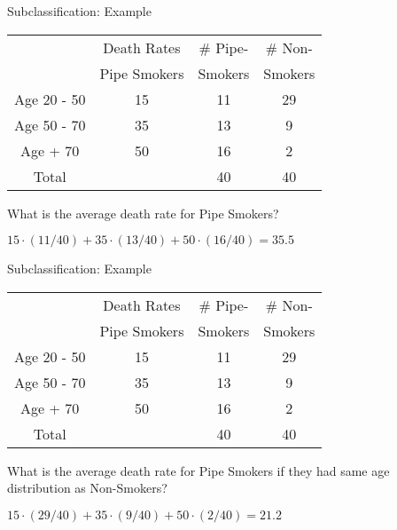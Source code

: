 \documentclass{beamer}
\numberwithin{equation}{section}
\begin{document}
\begin{frame}{Subclassification: Example}

\begin{center}
\begin{tabular}{|c|c|c|c|}
\hline
\multicolumn{ 1}{|c|}{} & \multicolumn{ 1}{c|}{Death Rates  } & \# Pipe- & \# Non- \\

\multicolumn{ 1}{|c|}{} & \multicolumn{ 1}{c|}{Pipe Smokers} &  Smokers  &  Smokers \\
\hline
Age 20 - 50  &         15 &         11 &         29 \\
\hline
Age 50 - 70  &         35 &         13 &          9 \\
\hline
 Age + 70  &         50 &         16 &          2 \\
\hline
    Total  &            &         40 &         40 \\
\hline
\end{tabular}
\end{center}

What is the average death rate for Pipe Smokers? \pause

$15\cdot(11/40)+35\cdot(13/40)+50\cdot(16/40)=35.5$

\end{frame}

\begin{frame}{Subclassification: Example}

\begin{center}
\begin{tabular}{|c|c|c|c|}
\hline
\multicolumn{ 1}{|c|}{} & \multicolumn{ 1}{c|}{Death Rates  } & \# Pipe- & \# Non- \\

\multicolumn{ 1}{|c|}{} & \multicolumn{ 1}{c|}{Pipe Smokers} &  Smokers  &  Smokers \\
\hline
Age 20 - 50  &         15 &         11 &         29 \\
\hline
Age 50 - 70  &         35 &         13 &          9 \\
\hline
 Age + 70  &         50 &         16 &          2 \\
\hline
    Total  &            &         40 &         40 \\
\hline
\end{tabular}
\end{center}

What is the average death rate for Pipe Smokers if they had same age
distribution as Non-Smokers? \pause

$15\cdot(29/40)+35\cdot(9/40)+50\cdot(2/40)=21.2$

\end{frame}
\end{document}
